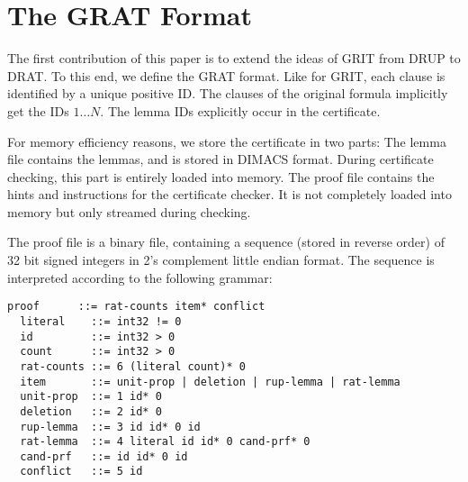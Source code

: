 \documentclass[smallcondensed]{svjour3}     %
\begin{document}
\section{The GRAT Format}\label{sec:grat-format}
The first contribution of this paper is to extend the ideas of GRIT from DRUP to DRAT.
To this end, we define the GRAT format. 
Like for GRIT, each clause is identified by a unique positive ID. 
The clauses of the original formula implicitly get the IDs $1\ldots N$. The lemma IDs explicitly occur in the certificate.

For memory efficiency reasons, we store the certificate in two parts: The lemma file contains the lemmas, and is stored in DIMACS format.
During certificate checking, this part is entirely loaded into memory.
The proof file contains the hints and instructions for the certificate checker. It is not completely loaded into memory but only streamed during checking.

The proof file is a binary file, containing a sequence (stored in reverse order) of 32 bit signed integers in 2's complement little endian format. 
The sequence is interpreted according to the following grammar:
\begin{lstlisting}[language={},columns={[c]fullflexible},literate={}]
  proof      ::= rat-counts item* conflict
  literal    ::= int32 != 0
  id         ::= int32 > 0
  count      ::= int32 > 0
  rat-counts ::= 6 (literal count)* 0
  item       ::= unit-prop | deletion | rup-lemma | rat-lemma
  unit-prop  ::= 1 id* 0
  deletion   ::= 2 id* 0
  rup-lemma  ::= 3 id id* 0 id
  rat-lemma  ::= 4 literal id id* 0 cand-prf* 0
  cand-prf   ::= id id* 0 id
  conflict   ::= 5 id
\end{lstlisting}
\end{document}
